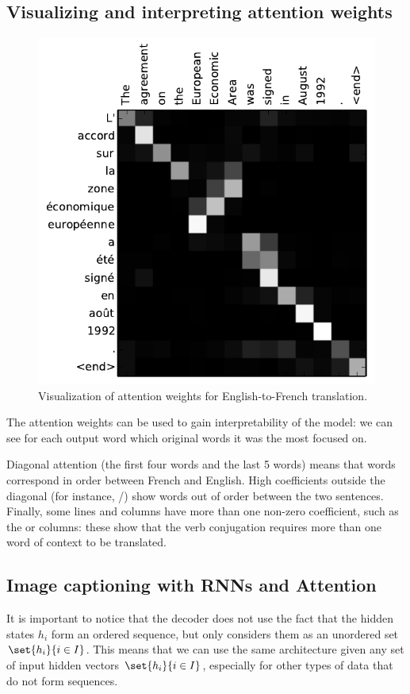 \subsection{Visualizing and interpreting attention weights}
\begin{figure}
    \captionsetup{justification=raggedleft}
    \centering
    \includegraphics[width=.45\textwidth]{images/attention-visualization.pdf}
    \caption{Visualization of attention weights for English-to-French translation.\protect\footnotemark}
\end{figure}
The attention weights can be used to gain interpretability of the model: we can see for each output word which original words it was the most focused on.  

Diagonal attention (the first four words and the last 5 words) means that words correspond in order between French and English. High coefficients outside the diagonal (for instance, /) show words out of order between the two sentences. Finally, some lines and columns have more than one non-zero coefficient, such as the  or  columns: these show that the verb conjugation requires more than one word of context to be translated.

\newpage
\subsection{Image captioning with RNNs and Attention}
It is important to notice that the decoder does not use the fact that the hidden states $h_i$ form an ordered sequence, but only considers them as an unordered set $\set{h_i}{i\in I}$. This means that we can use the same architecture given any set of input hidden vectors $\set{h_i}{i\in I}$, especially for other types of data that do not form sequences.

\newpage